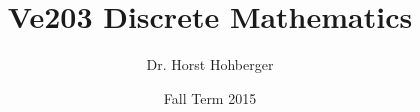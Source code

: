 \documentclass[smaller,hyperref={CJKbookmarks=true}]{beamer}
\begin{document}
\title[Ve203 Discrete Mathematics]{\large{Ve203 Discrete Mathematics}}
\author[Dr. Hohberger]{Dr. Horst Hohberger}
\date[Fall 2015]{Fall Term 2015}






\begin{frame}
\titlepage
\end{frame}
\setcounter{section}{-1}
\end{document}
